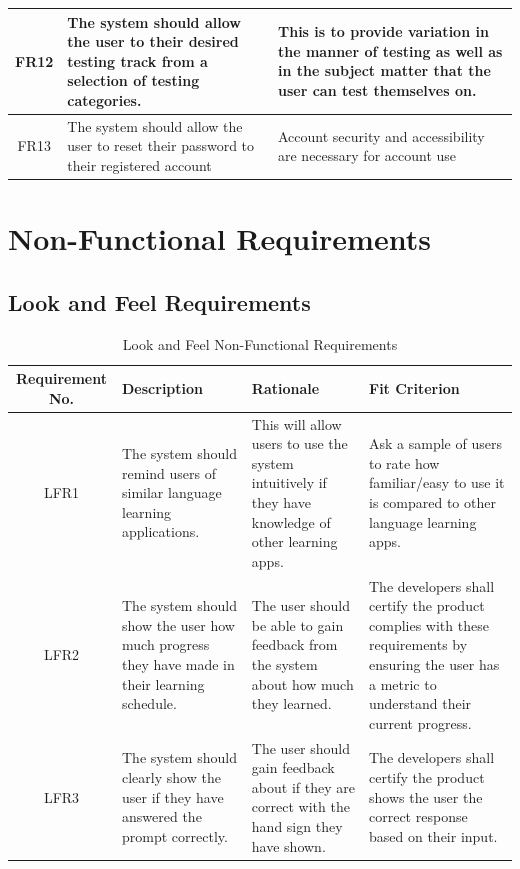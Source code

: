 \documentclass[12pt, titlepage]{article}
\begin{document}
\begin{longtable}{| c | p{4cm}| p{6cm}|}
    \hline
    FR12 & The system should allow the user to their desired testing track from a selection of testing categories. & This is to provide variation in the manner of testing as well as in the subject matter that the user can test themselves on. \\
    \hline
    FR13 & The system should allow the user to reset their password to their registered account & Account security and accessibility are necessary for account use\\
    \bottomrule
\end{longtable}

\section{Non-Functional Requirements}

\subsection{Look and Feel Requirements}

\begin{table}[H]
\caption{Look and Feel Non-Functional Requirements}
\noindent \begin{tabular}{| c | p{3cm}| p{3cm}| p{3cm}|}
\hline 
\textbf{Requirement No.} & \textbf{Description} & \textbf{Rationale} & \textbf{Fit Criterion}\\
\hline
LFR1 & The system should remind users of similar language learning applications. & This will allow users to use the system intuitively if they have knowledge of other learning apps. & Ask a sample of users to rate how familiar/easy to use it is compared to other language learning apps. \\
\hline
LFR2 & The system should show the user how much progress they have made in their learning schedule. & The user should be able to gain feedback from the system about how much they learned. & The developers shall certify the product complies with these requirements by ensuring the user has a metric to understand their current progress. \\
\hline
LFR3 & The system should clearly show the user if they have answered the prompt correctly. & The user should gain feedback about if they are correct with the hand sign they have shown. & The developers shall certify the product shows the user the correct response based on their input. \\
\bottomrule
\end{tabular}
\end{table}
\end{document}
